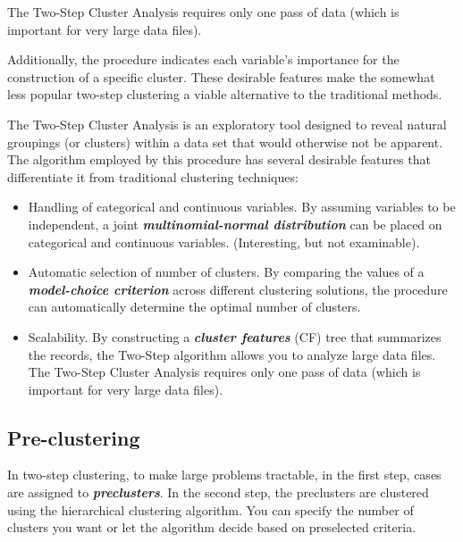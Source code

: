 \documentclass[a4paper,12pt]{article}
\begin{document}
The Two-Step Cluster Analysis requires only one pass of data
(which is important for very large data files).


Additionally, the procedure indicates each variable’s importance for the construction of a specific cluster. These desirable features make the somewhat less popular two-step clustering a viable alternative to the traditional
methods.


\noindent The Two-Step Cluster Analysis is an exploratory tool designed to reveal natural groupings (or clusters) within a data set that would otherwise not be apparent. The algorithm employed by this procedure has several desirable features that differentiate it from traditional clustering techniques:

\begin{itemize}
\item Handling of categorical and continuous variables. By assuming variables to be independent, a joint \textbf{\textit{multinomial-normal distribution}} can be placed on categorical and continuous variables. (Interesting, but not examinable).

 \item Automatic selection of number of clusters. By comparing the values of a \textbf{\textit{model-choice criterion}} across different clustering solutions, the procedure can automatically determine the optimal number of clusters.

\item Scalability. By constructing a \textbf{\textit{cluster features}} (CF) tree that summarizes the records, the Two-Step algorithm allows you to analyze large data files. The Two-Step Cluster Analysis requires only one pass of data (which is important for very large data files).

\end{itemize}


\newpage
\subsection{Pre-clustering }

In two-step clustering, to make large problems tractable, in the first step, cases are
assigned to \textbf{\textit{preclusters}}. In the second step, the preclusters are clustered using the
hierarchical clustering algorithm. You can specify the number of clusters you want or
let the algorithm decide based on preselected criteria.
\end{document}
